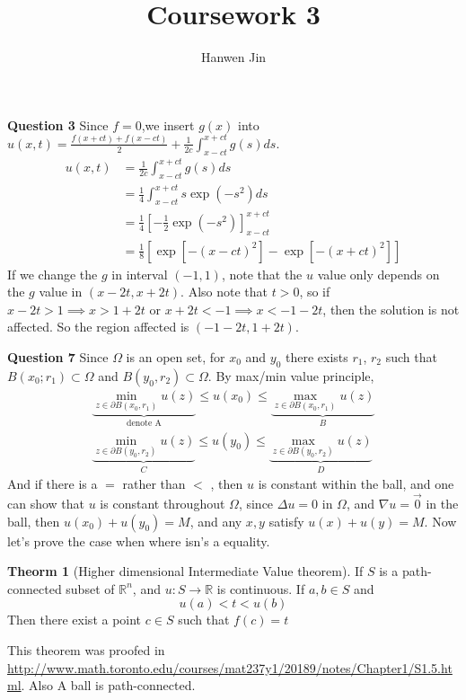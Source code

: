 \documentclass[a4paper]{article}
\title{Coursework 3}
\author{Hanwen Jin}
\theoremstyle{definition}
\newtheorem{theorem}{Theorm}
\begin{document}
	\maketitle
	\textbf{Question 3} Since $f=0$,we insert $g\left( x \right) $ into $u\left( x,t \right) =\frac{f\left( x+ct \right) +f\left( x-ct \right) }{2}+\frac{1}{2c}\int_{x-ct}^{x+ct} g\left( s \right) ds $. 
	\begin{align*}
		u\left( x,t \right) &= \frac{1}{2c}\int_{x-ct}^{x+ct} g\left( s \right) ds  \\
		&= \frac{1}{4}\int_{x-ct}^{x+ct} s\exp\left( -s^2 \right) ds  \\
		&= \frac{1}{4}\left[ -\frac{1}{2}\exp\left( -s^2 \right)  \right]^{x+ct}_{x-ct}  \\
		&= \frac{1}{8}\left[ \exp\left[- \left( x-ct \right) ^2\right]-\exp\left[- (x+ct)^2 \right]    \right]  
	\end{align*} 
	If we change the $g$ in interval $\left( -1,1 \right) $, note that the $u$ value only depends on the $g $ value in $(x-2t,x+2t)$. Also note that $t>0$, so if $x-2t>1\implies x>1+2t$ or $x+2t<-1\implies x<-1-2t$, then the solution is not affected. So the region affected is $\left( -1-2t,1+2t \right) $. 

	\textbf{Question 7} Since $\Omega$ is an open set, for $x_0$ and $y_0$ there exists $r_1$, $r_2$ such that $B\left( x_0;r_1 \right)\subset \Omega $ and $B\left( y_0,r_2 \right) \subset \Omega$. By max/min value principle, \begin{gather*}
		\underbrace{\min_{z\in \partial B\left( x_0,r_1 \right) }u\left( z \right) }_{\text{denote A}}\le u\left( x_0 \right) \le \underbrace{\max_{z\in \partial B(x_0,r_1)}u\left( z \right) }_{B}\\
		\underbrace{\min_{z\in \partial B\left( y_0,r_2 \right) }u\left( z \right) }_{C}\le u\left( y_0 \right) \le\underbrace{\max_{z\in \partial B\left( y_0,r_2 \right) }u\left( z \right) }_{D}
	\end{gather*} 
	And if there is a $=$ rather than $<$ , then $u$ is constant within the ball, and one can show that $u$ is constant throughout $\Omega$, since $\Delta u=0$ in $\Omega$, and $\nabla u=\vec{0} $ in the ball, then $u\left( x_0 \right) +u\left( y_0 \right) =M$, and any $x,y$ satisfy $u\left( x \right) +u\left( y \right) =M$. Now let's prove the case when where isn's a equality. 

	\begin{theorem}[Higher dimensional Intermediate Value theorem]
		If $S$ is a path-connected subset of $\mathbb{R}^{n}$, and $u:S\to \mathbb{R}$ is continuous. If $a,b \in S$ and 
		\begin{equation}
			u\left( a \right) <t<u\left( b \right) 
		\end{equation} 
		Then there exist a point $c\in S$ such that $f\left( c \right) =t$
	\end{theorem}
	This theorem was proofed in \url{http://www.math.toronto.edu/courses/mat237y1/20189/notes/Chapter1/S1.5.html}. Also A ball is path-connected.
\end{document}
